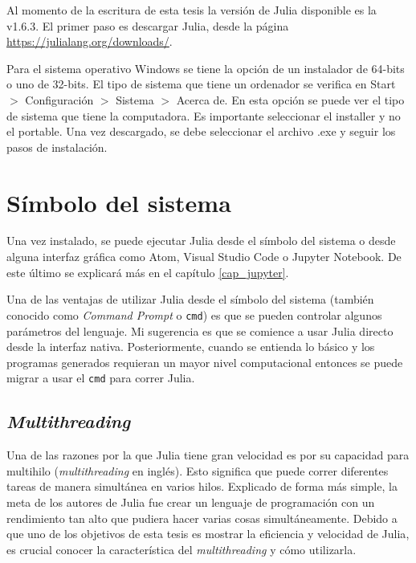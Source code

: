 Al momento de la escritura de esta tesis la versión de \textsf{Julia} disponible es la \textsf{v1.6.3}. El primer paso es descargar \textsf{Julia}, desde la página \url{https://julialang.org/downloads/}. 

Para el sistema operativo \textsf{Windows} se tiene la opción de un instalador de 64-bits o uno de 32-bits. El tipo de sistema que tiene un ordenador se verifica en \textsf{Start} $>$ \textsf{Configuración} $>$ \textsf{Sistema} $>$ \textsf{Acerca de}. En esta opción se puede ver el tipo de sistema que tiene la computadora. Es importante seleccionar el \textsf{installer} y no el \textsf{portable}. Una vez descargado, se debe seleccionar el archivo \textsf{.exe} y seguir los pasos de instalación. 

\section{Símbolo del sistema}
Una vez instalado, se puede ejecutar \textsf{Julia} desde el símbolo del sistema o desde alguna interfaz gráfica como \textsf{Atom}, \textsf{Visual Studio Code} o \textsf{Jupyter Notebook}. De este último se explicará más en el capítulo \ref{cap_jupyter}. 

Una de las ventajas de utilizar \textsf{Julia} desde el símbolo del sistema (también conocido como \textit{Command Prompt} o \texttt{cmd}) es que se pueden controlar algunos parámetros del lenguaje. Mi sugerencia es que se comience a usar \textsf{Julia} directo desde la interfaz nativa. Posteriormente, cuando se entienda lo básico y los programas generados requieran un mayor nivel computacional entonces se puede migrar a usar el \texttt{cmd} para correr \textsf{Julia}. 

\subsection{\textit{Multithreading}}
Una de las razones por la que \textsf{Julia} tiene gran velocidad es por su capacidad para multihilo (\textit{multithreading} en inglés). Esto significa que puede correr diferentes tareas de manera simultánea en varios hilos. Explicado de forma más simple, la meta de los autores de \textsf{Julia} fue crear un lenguaje de programación con un rendimiento tan alto que pudiera hacer varias cosas simultáneamente. Debido a que uno de los objetivos de esta tesis es mostrar la eficiencia y velocidad de \textsf{Julia}, es crucial conocer la característica del \textit{multithreading} y cómo utilizarla. 

